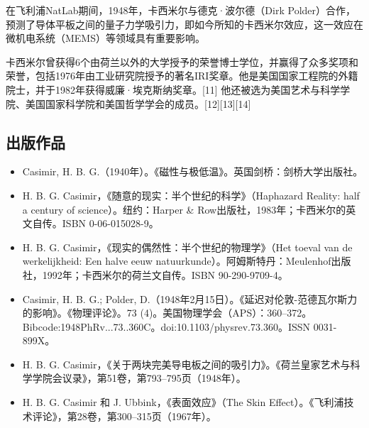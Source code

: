 在飞利浦NatLab期间，1948年，卡西米尔与德克·波尔德（Dirk Polder）合作，预测了导体平板之间的量子力学吸引力，即如今所知的卡西米尔效应，这一效应在微机电系统（MEMS）等领域具有重要影响。

卡西米尔曾获得6个由荷兰以外的大学授予的荣誉博士学位，并赢得了众多奖项和荣誉，包括1976年由工业研究院授予的著名IRI奖章。他是美国国家工程院的外籍院士，并于1982年获得威廉·埃克斯纳奖章。[11] 他还被选为美国艺术与科学学院、美国国家科学院和美国哲学学会的成员。[12][13][14]
\subsection{出版作品}
\begin{itemize}
\item Casimir, H. B. G.（1940年）。《磁性与极低温》。英国剑桥：剑桥大学出版社。
\item H. B. G. Casimir，《随意的现实：半个世纪的科学》（Haphazard Reality: half a century of science）。纽约：Harper & Row出版社，1983年；卡西米尔的英文自传。ISBN 0-06-015028-9。
\item H. B. G. Casimir，《现实的偶然性：半个世纪的物理学》（Het toeval van de werkelijkheid: Een halve eeuw natuurkunde）。阿姆斯特丹：Meulenhof出版社，1992年；卡西米尔的荷兰文自传。ISBN 90-290-9709-4。
\item Casimir, H. B. G.; Polder, D.（1948年2月15日）。《延迟对伦敦-范德瓦尔斯力的影响》。《物理评论》。73 (4)。美国物理学会（APS）：360–372。Bibcode:1948PhRv...73..360C。doi:10.1103/physrev.73.360。ISSN 0031-899X。
\item H. B. G. Casimir，《关于两块完美导电板之间的吸引力》。《荷兰皇家艺术与科学学院会议录》，第51卷，第793–795页（1948年）。
\item H. B. G. Casimir 和 J. Ubbink，《表面效应》（The Skin Effect）。《飞利浦技术评论》，第28卷，第300–315页（1967年）。
\end{itemize}
